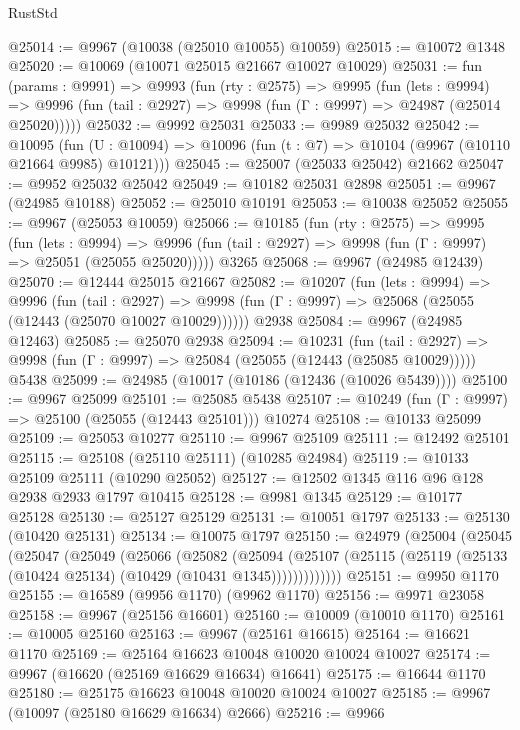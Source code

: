 \begin{lexlean}{RustStd}
\begin{coremodule}
@25014 := @9967 (@10038 (@25010 @10055) @10059)
@25015 := @10072 @1348
@25020 := @10069 (@10071 @25015 @21667 @10027 @10029)
@25031 := fun (params : @9991) =>
  @9993
    (fun (rty : @2575) =>
    @9995
      (fun (lets : @9994) =>
      @9996 (fun (tail : @2927) => @9998 (fun (Γ : @9997) => @24987 (@25014 @25020)))))
@25032 := @9992 @25031
@25033 := @9989 @25032
@25042 := @10095
    (fun (U : @10094) => @10096 (fun (t : @7) => @10104 (@9967 (@10110 @21664 @9985) @10121)))
@25045 := @25007 (@25033 @25042) @21662
@25047 := @9952 @25032 @25042
@25049 := @10182 @25031 @2898
@25051 := @9967 (@24985 @10188)
@25052 := @25010 @10191
@25053 := @10038 @25052
@25055 := @9967 (@25053 @10059)
@25066 := @10185
    (fun (rty : @2575) =>
    @9995
      (fun (lets : @9994) =>
      @9996 (fun (tail : @2927) => @9998 (fun (Γ : @9997) => @25051 (@25055 @25020)))))
    @3265
@25068 := @9967 (@24985 @12439)
@25070 := @12444 @25015 @21667
@25082 := @10207
    (fun (lets : @9994) =>
    @9996
      (fun (tail : @2927) =>
      @9998 (fun (Γ : @9997) => @25068 (@25055 (@12443 (@25070 @10027 @10029))))))
    @2938
@25084 := @9967 (@24985 @12463)
@25085 := @25070 @2938
@25094 := @10231
    (fun (tail : @2927) => @9998 (fun (Γ : @9997) => @25084 (@25055 (@12443 (@25085 @10029)))))
    @5438
@25099 := @24985 (@10017 (@10186 (@12436 (@10026 @5439))))
@25100 := @9967 @25099
@25101 := @25085 @5438
@25107 := @10249 (fun (Γ : @9997) => @25100 (@25055 (@12443 @25101))) @10274
@25108 := @10133 @25099
@25109 := @25053 @10277
@25110 := @9967 @25109
@25111 := @12492 @25101
@25115 := @25108 (@25110 @25111) (@10285 @24984)
@25119 := @10133 @25109 @25111 (@10290 @25052)
@25127 := @12502 @1345 @116 @96 @128 @2938 @2933 @1797 @10415
@25128 := @9981 @1345
@25129 := @10177 @25128
@25130 := @25127 @25129
@25131 := @10051 @1797
@25133 := @25130 (@10420 @25131)
@25134 := @10075 @1797
@25150 := @24979
    (@25004
      (@25045
        (@25047
          (@25049
            (@25066
              (@25082
                (@25094
                  (@25107 (@25115 (@25119 (@25133 (@10424 @25134) (@10429 (@10431 @1345)))))))))))))
@25151 := @9950 @1170
@25155 := @16589 (@9956 @1170) (@9962 @1170)
@25156 := @9971 @23058
@25158 := @9967 (@25156 @16601)
@25160 := @10009 (@10010 @1170)
@25161 := @10005 @25160
@25163 := @9967 (@25161 @16615)
@25164 := @16621 @1170
@25169 := @25164 @16623 @10048 @10020 @10024 @10027
@25174 := @9967 (@16620 (@25169 @16629 @16634) @16641)
@25175 := @16644 @1170
@25180 := @25175 @16623 @10048 @10020 @10024 @10027
@25185 := @9967 (@10097 (@25180 @16629 @16634) @2666)
@25216 := @9966

\end{coremodule}
\end{lexlean}
